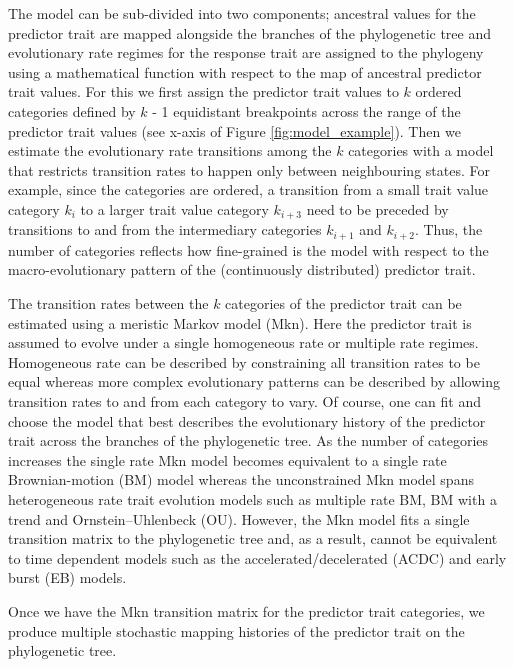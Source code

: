The model can be sub-divided into two components; ancestral values for the predictor trait are mapped alongside the branches of the phylogenetic tree and evolutionary rate regimes for the response trait are assigned to the phylogeny using a mathematical function with respect to the map of ancestral predictor trait values. For this we first assign the predictor trait values to $\mathit{k}$ ordered categories defined by $\mathit{k}$ - 1 equidistant breakpoints across the range of the predictor trait values (see x-axis of Figure \ref{fig:model_example}). Then we estimate the evolutionary rate transitions among the $\mathit{k}$ categories with a model that restricts transition rates to happen only between neighbouring states. For example, since the categories are ordered, a transition from a small trait value category $\mathit{k_{i}}$ to a larger trait value category $\mathit{k_{i+3}}$ need to be preceded by transitions to and from the intermediary categories $\mathit{k_{i+1}}$ and $\mathit{k_{i+2}}$. Thus, the number of categories reflects how fine-grained is the model with respect to the macro-evolutionary pattern of the (continuously distributed) predictor trait.

The transition rates between the $\mathit{k}$ categories of the predictor trait can be estimated using a meristic Markov model (Mkn). Here the predictor trait is assumed to evolve under a single homogeneous rate or multiple rate regimes. Homogeneous rate can be described by constraining all transition rates to be equal whereas more complex evolutionary patterns can be described by allowing transition rates to and from each category to vary. Of course, one can fit and choose the model that best describes the evolutionary history of the predictor trait across the branches of the phylogenetic tree. As the number of categories increases the single rate Mkn model becomes equivalent to a single rate Brownian-motion (BM) model whereas the unconstrained Mkn model spans heterogeneous rate trait evolution models such as multiple rate BM, BM with a trend and Ornstein–Uhlenbeck (OU). However, the Mkn model fits a single transition matrix to the phylogenetic tree and, as a result, cannot be equivalent to time dependent models such as the accelerated/decelerated (ACDC) and early burst (EB) models.

Once we have the Mkn transition matrix for the predictor trait categories, we produce multiple stochastic mapping histories of the predictor trait on the phylogenetic tree. 















